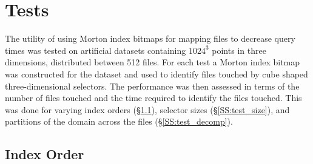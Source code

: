 \documentclass[apjl]{emulateapj}
\begin{document}
\section{Tests}\label{S:tests}
The utility of using Morton index bitmaps for mapping files to decrease query times was tested on artificial datasets containing $1024^3$ points in three dimensions, distributed between 512 files. For each test a Morton index bitmap was constructed for the dataset and used to identify files touched by cube shaped three-dimensional selectors. The performance was then assessed in terms of the number of files touched and the time required to identify the files touched. This was done for varying index orders (\S\ref{SS:test_order}), selector sizes (\S\ref{SS:test_size}), and partitions of the domain across the files (\S\ref{SS:test_decomp}).

\subsection{Index Order}\label{SS:test_order}
\end{document}
